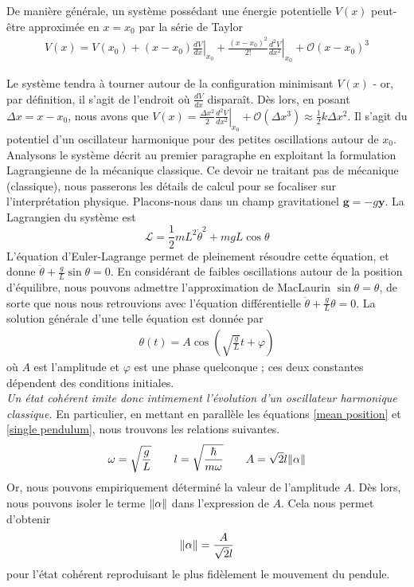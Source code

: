 \documentclass[11pt,oneside,a4paper]{article}
\newcommand{\h}{\ensuremath{\hbar}}
\begin{document}
De manière générale, un système possédant une énergie potentielle $V(x)$ peut-être approximée en $x=x_0$ par la série de Taylor
\begin{align*}
  V(x) = V(x_0) + \left(x-x_0\right)\left.\frac{dV}{dx}\right|_{x_0} + \frac{\left(x-x_0\right)^2}{2!} \left.\frac{d^2V}{dx^2}\right|_{x_0} + \mathcal O(x-x_0)^3
\end{align*} 

Le système tendra à tourner autour de la configuration minimisant $V(x)$ - or, par définition, il s'agit de l'endroit où $\frac{dV}{dx}$ disparaît. Dès lors, en posant $\Delta x = x-x_0$, nous avons que $V(x) = \frac{\Delta x^2}{2} \left.\frac{d^2V}{dx^2}\right|_{x_0} + \mathcal O(\Delta x^3) \approx \frac{1}{2}k\Delta x^2$. Il s'agit du potentiel d'un oscillateur harmonique pour des petites oscillations autour de $x_0$.\\

Analysons le système décrit au premier paragraphe en exploitant la formulation Lagrangienne de la mécanique classique. Ce devoir ne traitant pas de mécanique (classique), nous passerons les détails de calcul pour se focaliser sur l'interprétation physique. Placons-nous dans un champ gravitationel $\bm{g} = -g\bm{\bm{y}}$. La Lagrangien du système est 
\begin{equation*}
  \mathcal{L} = \frac{1}{2}mL^2\dot{\theta}^2 + mgL\cos\theta 
\end{equation*}
L'équation d'Euler-Lagrange permet de pleinement résoudre cette équation, et donne $\ddot{\theta} + \frac{g}{L}\sin\theta =  0$. En considérant de faibles oscillations autour de la position d'équilibre, nous pouvons admettre l'approximation de MacLaurin $\sin\theta=\theta$, de sorte que nous nous retrouvions avec l'équation différentielle $\ddot{\theta} + \frac{g}{L}\theta = 0$. La solution générale d'une telle équation est donnée par
\begin{align}
  \label{single pendulum}
  \theta(t) = A\cos(\sqrt{\frac{g}{L}}t+\varphi)
\end{align}
où $A$ est l'amplitude et $\varphi$ est une phase quelconque ; ces deux constantes dépendent des conditions initiales.\\

\emph{Un état cohérent imite donc intimement l'évolution d'un oscillateur harmonique classique.} En particulier, en mettant en parallèle les équations \eqref{mean position} et \eqref{single pendulum}, nous trouvons les relations suivantes.
\begin{equation}
  \omega = \sqrt{\frac{g}{L}}\qquad
  l = \sqrt{\frac{\h}{m\omega}}\qquad
  A = \sqrt{2}l\norm{\alpha}\label{eq:46}
\end{equation}
Or, nous pouvons empiriquement déterminé la valeur de l'amplitude $A$. Dès lors, nous pouvons isoler le terme $\norm{\alpha}$ dans l'expression de $A$. Cela nous permet d'obtenir
\begin{equation}
  \label{89}
  \norm{\alpha}= \frac{A}{\sqrt{2}l} 
\end{equation}
pour l'état cohérent reproduisant le plus fidèlement le mouvement du pendule.\\
\end{document}
